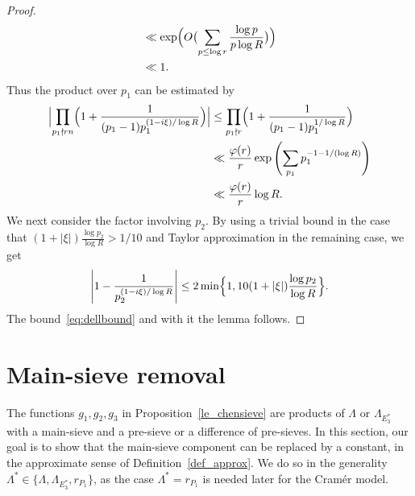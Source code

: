 \documentclass[12pt]{amsart}
\theoremstyle{definition}
\theoremstyle{remark}
\numberwithin{equation}{section}
\newcommand{\1}{\mathbf{1}}
\begin{document}
\begin{proof}
\begin{align*}
        &\ll \exp \Bigl(O\bigl(\sum_{p\leq \log r} \frac{\log p}{p \log R}\bigr) \Bigr)\\
        &\ll 1.
    \end{align*}
     Thus the product over $p_1$ can be estimated by
    \begin{align*}
        \Bigl|\prod_{p_1\nmid r n}\Bigl(1+\frac{1}{(p_1-1)p_1^{(1-i\xi)/\log R}} \Bigr)\Bigr|&\leq \prod_{p_1\nmid r}\Bigl(1+\frac{1}{(p_1-1)p_1^{1/\log R}} \Bigr)\\
        &\ll  \frac{\varphi(r )}{r }\exp\left(\sum_{p_1}p_1^{-1-1/(\log R)}\right)\\
        &\ll \frac{\varphi(r)}{r } \log R.
    \end{align*}
    We next consider the factor involving $p_2$. 
   By using a trivial bound in the case that $(1+|\xi|)\tfrac{\log p_2}{\log R}>1/10$ and Taylor approximation in the remaining case, we get 
   \begin{align*}
       \left|1-\frac{1}{p_2^{(1-i\xi)/\log R}}\right| \leq 2\min\Bigl\{1,10(1+|\xi|)\frac{\log p_2}{\log R}\Bigr\}.
   \end{align*}
    The bound~\eqref{eq:dellbound} and with it the lemma follows. 
    \end{proof}


\section{Main-sieve removal}\label{sec:MSremoval}

The functions $g_1,g_2,g_3$ in Proposition~\ref{le_chensieve} are products of $\Lambda$ or $\Lambda_{E_3^*}$ with a main-sieve and a pre-sieve or a difference of pre-sieves. In this section, our goal is to show that the main-sieve component can be replaced by a constant, in the approximate sense of Definition~\ref{def_approx}. We do so in the generality $\Lambda^*\in\{\Lambda,\Lambda_{E_3^*},r_{P_1}\}$, as the case $\Lambda^*=r_{P_1}$ is needed later for the Cram\'er model.
\end{document}
